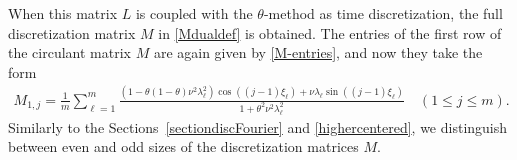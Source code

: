 \documentclass[smallextended,numbook,runningheads]{svjour3}     %
\begin{document}
When this matrix $L$ is coupled with the $\theta$-method as time discretization, the full discretization
matrix $M$ in \eqref{Mdualdef} is obtained.
The entries of the first row of the circulant matrix $M$ are again given by \eqref{M-entries}, and now
they take the form
\begin{align}\label{eq51}
	M_{1,j}  = \frac{1}{m} \sum_{\ell=1}^{m} \frac{\left(1-\theta(1-\theta)\nu^2\lambda_\ell^2\right)
  \cos((j-1)\xi_\ell) + \nu\lambda_\ell\sin((j-1)\xi_\ell)}{1+\theta^2\nu^2\lambda_\ell^2} \quad (1\le j \le m).
\end{align}
Similarly to the Sections~\ref{sectiondiscFourier} and \ref{highercentered}, we distinguish between even and
odd sizes of the discretization matrices $M$.
\end{document}
